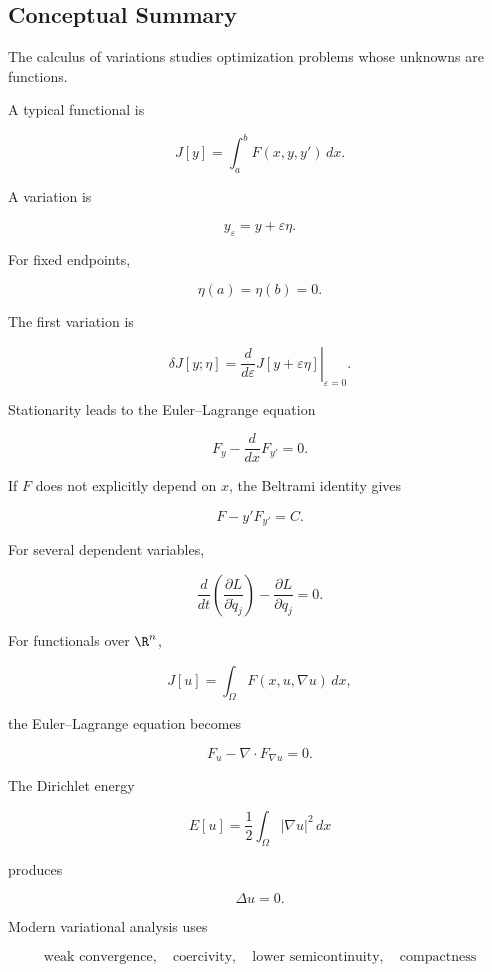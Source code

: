 \subsection{Conceptual Summary}
\label{subsec:calculus-variations-summary}

The calculus of variations studies optimization problems whose unknowns
are functions.

A typical functional is

\[
\boxed{
J[y]
=
\int_a^b
F(x,y,y')\,dx.
}
\]

A variation is

\[
\boxed{
y_\varepsilon
=
y+\varepsilon\eta.
}
\]

For fixed endpoints,

\[
\boxed{
\eta(a)=\eta(b)=0.
}
\]

The first variation is

\[
\boxed{
\delta J[y;\eta]
=
\left.
\frac{d}{d\varepsilon}
J[y+\varepsilon\eta]
\right|_{\varepsilon=0}.
}
\]

Stationarity leads to the Euler--Lagrange equation

\[
\boxed{
F_y
-
\frac{d}{dx}F_{y'}
=
0.
}
\]

If \(F\) does not explicitly depend on \(x\), the Beltrami identity gives

\[
\boxed{
F-y'F_{y'}
=
C.
}
\]

For several dependent variables,

\[
\boxed{
\frac{d}{dt}
\left(
\frac{\partial L}{\partial\dot q_j}
\right)
-
\frac{\partial L}{\partial q_j}
=
0.
}
\]

For functionals over \(\R^n\),

\[
J[u]
=
\int_\Omega
F(x,u,\nabla u)\,dx,
\]

the Euler--Lagrange equation becomes

\[
\boxed{
F_u
-
\nabla\cdot F_{\nabla u}
=
0.
}
\]

The Dirichlet energy

\[
\boxed{
E[u]
=
\frac12
\int_\Omega|\nabla u|^2\,dx
}
\]

produces

\[
\boxed{
\Delta u=0.
}
\]

Modern variational analysis uses

\[
\boxed{
\text{weak convergence},
\quad
\text{coercivity},
\quad
\text{lower semicontinuity},
\quad
\text{compactness}
}
\]

